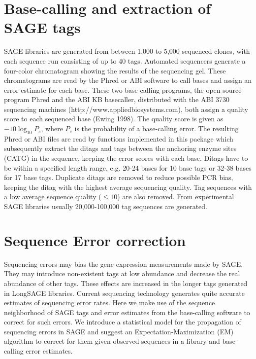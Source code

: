 \documentclass[12pt]{article}
\begin{document}
\section{Base-calling and extraction of SAGE tags}

SAGE libraries are generated from between 1,000 to 5,000 sequenced clones, with
each sequence run consisting of up to 40 tags. Automated sequencers generate a
four-color chromatogram showing the results of the sequencing gel. These
chromatograms are read by the Phred or ABI software to call bases and assign an
error estimate for each base. These two base-calling programs, the open source
program Phred and the ABI KB basecaller, distributed with the ABI 3730
sequencing machines (http://www.appliedbiosystems.com), both assign a quality
score to each sequenced base (Ewing 1998). The quality score is given as $-10
\log_{10} P_e$, where $P_e$ is the probability of a base-calling error. The
resulting Phred or ABI files are read by functions implemented in this package
which subsequently extract the ditags and tags between the anchoring enzyme
sites (CATG) in the sequence, keeping the error scores with each base. Ditags
have to be within a specified length range, e.g. 20-24 bases for 10 base tags or
32-38 bases for 17 base tags. Duplicate ditags are removed to reduce possible
PCR bias, keeping the ditag with the highest average sequencing quality. Tag
sequences with a low average sequence quality ($\le 10$) are also removed. From
experimental SAGE libraries usually 20,000-100,000 tag sequences are generated.

\section{Sequence Error correction}

Sequencing errors may bias the gene expression measurements made by SAGE. They
may introduce non-existent tags at low abundance and decrease the real abundance
of other tags. These effects are increased in the longer tags generated in
LongSAGE libraries. Current sequencing technology generates quite accurate
estimates of sequencing error rates. Here we make use of the sequence
neighborhood of SAGE tags and error estimates from the base-calling software to
correct for such errors. We introduce a statistical model for the propagation of
sequencing errors in SAGE and suggest an Expectation-Maximization (EM) algorithm
to correct for them given observed sequences in a library and base-calling error
estimates.
\end{document}
